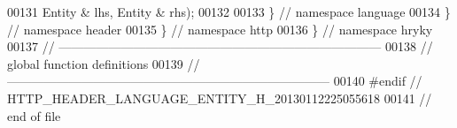 \begin{DoxyCode}
00131         Entity & lhs, Entity & rhs);
00132 
00133 \} \textcolor{comment}{// namespace language}
00134 \} \textcolor{comment}{// namespace header}
00135 \} \textcolor{comment}{// namespace http}
00136 \} \textcolor{comment}{// namespace hryky}
00137 \textcolor{comment}{//
      ------------------------------------------------------------------------------}
00138 \textcolor{comment}{// global function definitions}
00139 \textcolor{comment}{//
      ------------------------------------------------------------------------------}
00140 \textcolor{preprocessor}{#endif // HTTP\_HEADER\_LANGUAGE\_ENTITY\_H\_20130112225055618}
00141 \textcolor{preprocessor}{}\textcolor{comment}{// end of file}
\end{DoxyCode}
